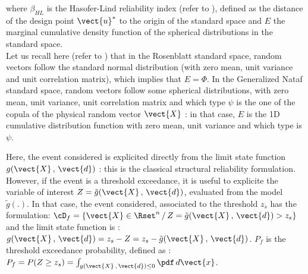 {\begin{enumerate}
    where $\beta_{HL}$ is the Hasofer-Lind reliability index (refer to  ), defined as the distance of the design point $\vect{u}^*$ to the origin of the standard space and $E$ the marginal cumulative density function of the spherical distributions in the standard space.\\

    Let us recall here (refer to ) that in the Rosenblatt standard space, random vectors follow the standard normal distribution (with zero mean, unit variance and unit correlation matrix), which implies that $E = \Phi$. In the Generalized Nataf standard space, random vectors follow some spherical distributions, with zero mean, unit variance, unit correlation matrix and which type $\psi$ is the one of the copula of the physical random vector $\vect{X}$ : in that case, $E$ is the 1D cumulative distribution function with zero mean, unit variance and which type is $\psi$.
  \end{enumerate}
}
{
  Here, the event considered is explicited directly from the limit state function $g(\vect{X}\,,\,\vect{d})$ : this is the classical structural reliability formulation.\\
  However, if the event is a threshold exceedance, it is useful to explicite the variable of interest $Z=\tilde{g}(\vect{X}\,,\,\vect{d})$, evaluated from the model $\tilde{g}(.)$. In that case, the event considered, associated to the threshold $z_s$ has the formulation: $\cD_f = \{ \vect{X} \in \Rset^n \, / \, Z=\tilde{g}(\vect{X}\,,\,\vect{d}) > z_s \}$
  and the limit state function is : $g(\vect{X}\,,\,\vect{d}) = z_s - Z = z_s - \tilde{g}(\vect{X}\,,\,\vect{d})$. $P_f$ is the threshold exceedance probability, defined as : $P_f     =       P(Z \geq z_s) = \int_{g(\vect{X}\,,\,\vect{d}) \le 0}  \pdf\, d\vect{x}$.
}


